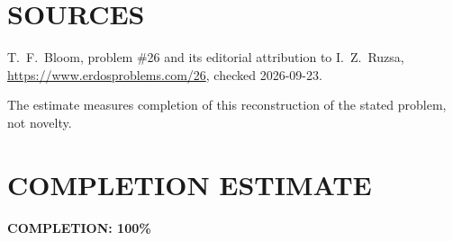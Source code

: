 \section{SOURCES}
T.~F.~Bloom, problem \#26 and its editorial attribution to I.~Z.~Ruzsa,
\url{https://www.erdosproblems.com/26}, checked 2026-09-23.

The estimate measures completion of this reconstruction of the stated
problem, not novelty.

\section{COMPLETION ESTIMATE}
\textbf{COMPLETION: 100\%}
